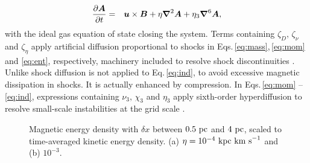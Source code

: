 \documentclass[preprint2]{aastex63}
\newcommand{\vect}[1]{{{\mbox{\boldmath $#1$}}}}%
\newcommand\kpc{~ {\rm kpc}}
\newcommand\pc{~ {\rm pc}}
\newcommand\dx{ {\delta x}}
\newcommand\kms{~ {\rm km~ s}^{-1}}
\begin{document}
  \begin{eqnarray}
  \label{eq:ind}
    \frac{\partial \vect{A}}{\partial t} &=&
    \vect{u}\times\vect{B}
    +\eta\vect\nabla^2\vect{A}
    +\eta_3\vect\nabla^6\vect{A},
  \end{eqnarray}
 with the ideal gas equation of state closing the system.
 Terms containing $\zeta_D,\,\zeta_\nu$ and $\zeta_\eta$ apply artificial
 diffusion proportional to shocks in Eqs.\,\eqref{eq:mass},\,\eqref{eq:mom} and
 \eqref{eq:ent}, respectively,
 machinery included to resolve shock discontinuities 
 \citep[][for details]{GMKSH20}.
 Unlike \citet{Gent:2013b} shock diffusion is not applied to
 Eq.\,\eqref{eq:ind}, to avoid excessive magnetic dissipation in shocks.
 It is actually enhanced by compression.
 In Eqs.\,\eqref{eq:mom} -- \eqref{eq:ind}, expressions containing 
 $\nu_3,\,\chi_3$ and $\eta_3$ apply sixth-order hyperdiffusion
 to resolve small-scale instabilities at the grid scale
\citep[see, e.g.,][]{ABGS02,HB04}.

\begin{figure*}
\caption{
 Magnetic energy density with $\dx$ between $0.5\pc$ and $4\pc$,
 scaled to time-averaged kinetic energy density.
 (a) $\eta=10^{-4}\kpc\kms$ and (b) $10^{-3}$.
\label{fig:eb-res}}
\end{figure*}
\end{document}
